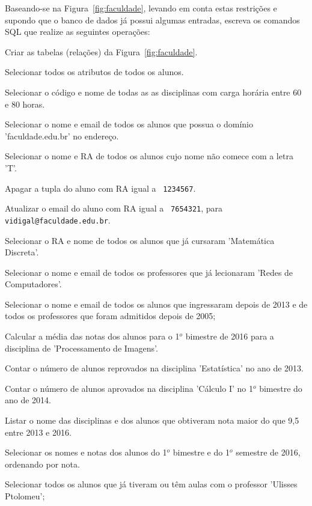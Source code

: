 

Baseando-se na Figura~\ref{fig:faculdade}, levando em conta estas
  restrições e supondo que o banco de dados já possui algumas
  entradas, escreva os comandos SQL que realize as seguintes operações:

   Criar as tabelas (relações) da
  Figura~\ref{fig:faculdade}.

   Selecionar todos os atributos de todos os alunos.

   Selecionar o código e nome de todas as as
  disciplinas com carga horária entre 60 e 80 horas.

   Selecionar o nome e email de todos os alunos que
  possua o domínio 'faculdade.edu.br' no endereço.

   Selecionar o nome e RA de todos os alunos cujo
  nome não comece com a letra 'T'.
  
   Apagar a tupla do aluno com RA igual a {\tt
    1234567}.

   Atualizar o email do aluno com RA igual a {\tt
    7654321}, para {\tt vidigal@faculdade.edu.br}.
  
   Selecionar o RA e nome de todos os alunos que já
  cursaram 'Matemática Discreta'.
  
   Selecionar o nome e email de todos os professores que
  já lecionaram 'Redes de Computadores'.

   Selecionar o nome e email de todos os alunos que
  ingressaram depois de 2013 e de todos os professores que foram
  admitidos depois de 2005;

   Calcular a média das notas dos alunos para o 1$^o$ 
  bimestre de 2016 para a disciplina de 'Processamento de Imagens'.

   Contar o número de alunos reprovados na disciplina
  'Estatística' no ano de 2013.

   Contar o número de alunos aprovados na disciplina
  'Cálculo I' no 1$^o$ bimestre do ano de 2014.

   Listar o nome das disciplinas e dos alunos que
  obtiveram nota maior do que 9,5 entre 2013 e 2016.
  
   Selecionar os nomes e notas dos alunos  do 1$^o$ bimestre
  e do 1$^o$ semestre de 2016, ordenando por nota.
  
   Selecionar todos os alunos que já tiveram ou têm aulas 
  com o professor 'Ulisses Ptolomeu';
  

